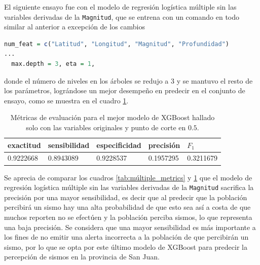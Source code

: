 \documentclass[a4paper]{report}
\begin{document}
El siguiente ensayo fue con el modelo de regresión logística múltiple sin las variables derivadas de la \verb'Magnitud', que se entrena con un comando en todo similar al anterior a excepción de los cambios
\begin{lstlisting}[language=R, breaklines=true]
num_feat = c("Latitud", "Longitud", "Magnitud", "Profundidad")
... 
  max.depth = 3, eta = 1, 
\end{lstlisting}
donde el número de niveles en los árboles se redujo a 3 y se mantuvo el resto de los parámetros, lográndose un mejor desempeño en predecir en el conjunto de ensayo, como se muestra en el cuadro \ref{tab:xgboost_metrics_sin_derivadas}.

\begin{table}[!ht]
	\centering
	\begin{tabular}{lllll}
	\toprule
	exactitud & sensibilidad & especificidad & precisión & \(F_1\) \\
	\midrule
	\num{0.9222668} & \num{0.8943089} & \num{0.9228537} & \num{0.1957295} & \num{0.3211679} \\
	\bottomrule
	\end{tabular}
	\caption{Métricas de evaluación para el mejor modelo de XGBoost hallado solo con las variables originales y punto de corte en \(0.5\).}
	\label{tab:xgboost_metrics_sin_derivadas}
\end{table}

Se aprecia de comparar los cuadros \ref{tab:múltiple_metrics} y \ref{tab:xgboost_metrics_sin_derivadas} que el modelo de regresión logística múltiple sin las variables derivadas de la \verb'Magnitud' sacrifica la precisión por una mayor sensibilidad, es decir que al predecir que la población percibirá un sismo hay una alta probabilidad de que esto sea así a costa de que muchos reporten no se efectúen y la población perciba sismos, lo que representa una baja precisión.
Se considera que una mayor sensibilidad es más importante a los fines de no emitir una alerta incorrecta a la población de que percibirán un sismo, por lo que se opta por este último modelo de XGBoost para predecir la percepción de sismos en la provincia de San Juan. 



\end{document}
